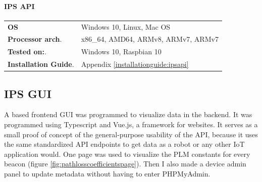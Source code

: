 \documentclass[a4paper, oneside]{ipsreport}
\begin{document}
\paragraph{IPS API}
\begin{tabular}{ll}
\textbf{OS} & Windows 10, Linux, Mac OS \\
\textbf{Processor arch}. & x86\_64, AMD64, ARMv8, ARMv7, ARMv7 \\
\textbf{Tested on:}. & Windows 10, Raspbian 10\\
\textbf{Installation Guide}. & Appendix \ref{installationguide:ipsapi}\\
\end{tabular}

\subsection{IPS GUI}
A based frontend GUI was programmed to visualize data in the backend. It was programmed using Typescript and Vue.js, a framework for websites. It serves as a small proof of concept of the general-purpose usability of the API, because it uses the same standardized API endpoints to get data as a robot or any other IoT application would. One page was used to visualize the PLM constants for every beacon (figure \ref{fig:pathlosscoefficientspage}). Then I also made a device admin panel to update metadata without having to enter PHPMyAdmin.
\end{document}
